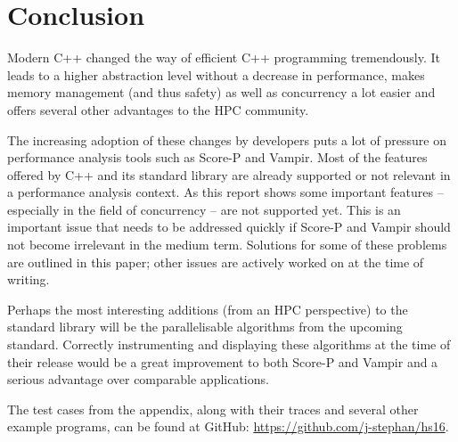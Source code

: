 \section{Conclusion}

Modern C++ changed the way of efficient C++ programming tremendously. It leads to a higher abstraction level without a decrease in performance, makes memory management (and thus safety) as well as concurrency a lot easier and offers several other advantages to the HPC community.

The increasing adoption of these changes by developers puts a lot of pressure on performance analysis tools such as Score-P and Vampir. Most of the features offered by C++ and its standard library are already supported or not relevant in a performance analysis context. As this report shows some important features -- especially in the field of concurrency -- are not supported yet. This is an important issue that needs to be addressed quickly if Score-P and Vampir should not become irrelevant in the medium term. Solutions for some of these problems are outlined in this paper; other issues are actively worked on at the time of writing.

Perhaps the most interesting additions (from an HPC perspective) to the standard library will be the parallelisable algorithms from the upcoming standard. Correctly instrumenting and displaying these algorithms at the time of their release would be a great improvement to both Score-P and Vampir and a serious advantage over comparable applications.

The test cases from the appendix, along with their traces and several other example programs, can be found at GitHub: \url{https://github.com/j-stephan/hs16}.